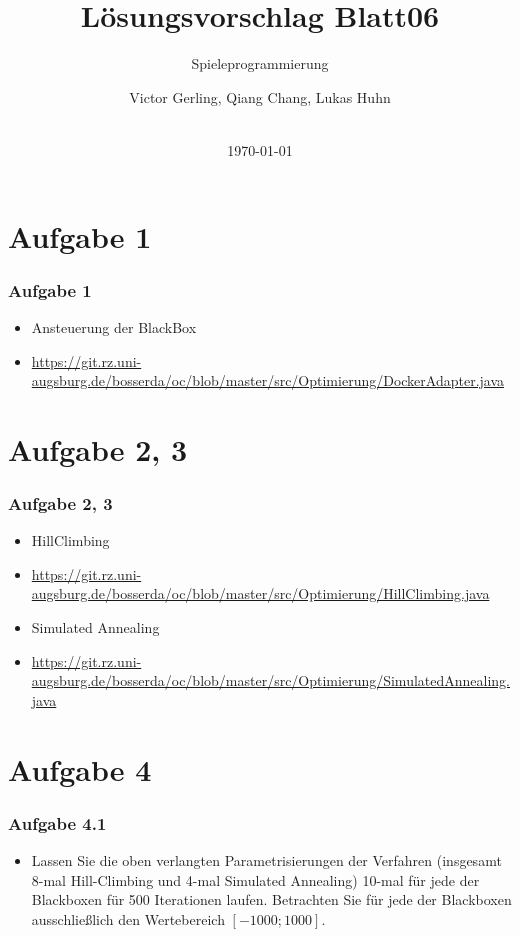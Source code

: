 \documentclass[xcolor=pdftex,dvipsnames,table]{beamer}
\title[Organic Computing 2]{Lösungsvorschlag Blatt06}
\subtitle{Spieleprogrammierung}
\author{Victor Gerling, Qiang Chang, Lukas Huhn}
\institute[Uni Augsburg]{Institut für Informatik, Lehrstuhl für Organic Computing}
\date[]{\\\today}
\begin{document}
\begin{frame}
  \titlepage
\end{frame}

\section*{Aufgabe 1}
\begin{frame}
  \frametitle{Aufgabe 1}
  \begin{itemize}
  		\item Ansteuerung der BlackBox
  	  \item \url{https://git.rz.uni-augsburg.de/bosserda/oc/blob/master/src/Optimierung/DockerAdapter.java}
  \end{itemize}
\end{frame}


\section*{Aufgabe 2, 3}
\begin{frame}
  \frametitle{Aufgabe 2, 3}
  \begin{itemize}
  		\item HillClimbing
  	  	\item \url{https://git.rz.uni-augsburg.de/bosserda/oc/blob/master/src/Optimierung/HillClimbing.java}
  	  	\item Simulated Annealing
  	  	\item \url{https://git.rz.uni-augsburg.de/bosserda/oc/blob/master/src/Optimierung/SimulatedAnnealing.java}
  \end{itemize}
\end{frame}


\section*{Aufgabe 4}

\begin{frame}
  \frametitle{Aufgabe 4.1}
  \begin{itemize}
  		\item Lassen Sie die oben verlangten Parametrisierungen der Verfahren (insgesamt 8-mal Hill-Climbing
und 4-mal Simulated Annealing) 10-mal für jede der Blackboxen für 500 Iterationen laufen. Betrachten
Sie für jede der Blackboxen ausschließlich den Wertebereich $[-1000; 1000]$.
  \end{itemize}
\end{frame}
\end{document}

